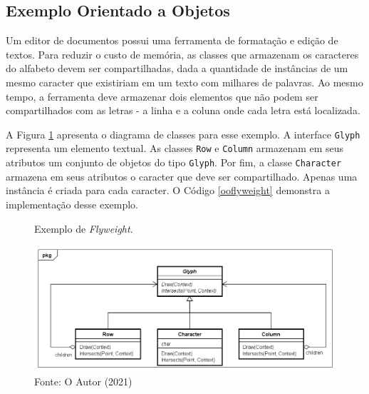 \subsection*{Exemplo Orientado a Objetos}

Um editor de documentos possui uma ferramenta 
de formatação e edição de textos. Para reduzir o 
custo de memória, as classes que armazenam os 
caracteres do alfabeto devem ser compartilhadas, 
dada a quantidade de instâncias de um mesmo caracter 
que existiriam em um texto com milhares de palavras. 
Ao mesmo tempo, a ferramenta deve armazenar dois 
elementos que não podem ser compartilhados com as 
letras - a linha e a coluna onde cada letra está 
localizada. 

A Figura \ref{flyweight_exemplo} apresenta o diagrama 
de classes para esse exemplo. A interface \texttt{Glyph} 
representa um elemento textual. As classes \texttt{Row} e 
\texttt{Column} armazenam em seus atributos um conjunto de objetos 
do tipo \texttt{Glyph}. 
Por fim, a classe \texttt{Character} armazena em seus atributos 
o caracter que deve ser compartilhado. Apenas uma 
instância é criada para cada caracter. O 
Código \ref{ooflyweight} demonstra a implementação 
desse exemplo.

\begin{figure}[htb]
	\caption{\label{flyweight_exemplo}Exemplo de \textit{Flyweight}.}
	\begin{center}
	    \includegraphics[scale=0.5]{5_padroes-contexto-funcional/5.2_estruturais/5.2.6_flyweight/flyweight_exemplo.png}
	\end{center}
  \caption*{Fonte: O Autor (2021)}
\end{figure}

